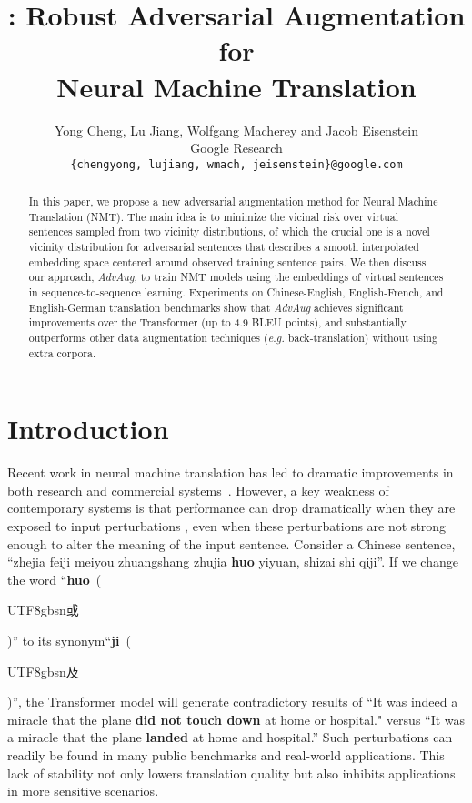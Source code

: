 \documentclass[11pt,a4paper]{article}
\title{\fancyname: Robust Adversarial Augmentation for \\ Neural Machine Translation
}
\author{Yong Cheng, Lu Jiang, Wolfgang Macherey and Jacob Eisenstein \\
Google Research \\
\texttt{\{chengyong, lujiang, wmach, jeisenstein\}@google.com}\\}
\date{}
\newcommand{\eg}{\emph{e.g. }} \newcommand{\Eg}{\emph{E.g}}
\newcommand{\cn}[1]{\begin{CJK*}{UTF8}{gbsn}{#1}\end{CJK*}}
\newcommand{\fancyname}{AdvAug}
\begin{document}
\maketitle
\begin{abstract}
In this paper, we propose a new adversarial augmentation method for Neural Machine Translation (NMT).
The main idea is to minimize the vicinal risk over virtual sentences sampled from two vicinity distributions, of which the crucial one is a novel vicinity distribution for adversarial sentences that describes a smooth interpolated embedding space centered around observed training sentence pairs. We then discuss our approach, {\em \fancyname}, to train NMT models using the embeddings of virtual sentences in sequence-to-sequence learning. Experiments on Chinese-English, English-French, and English-German translation benchmarks show that {\em \fancyname} achieves significant improvements over the Transformer (up to 4.9 BLEU points), and substantially outperforms other data augmentation techniques (\eg back-translation) without using extra corpora.
\end{abstract}

\section{Introduction}
Recent work in neural machine translation \cite{Bahdanau:15,Gehring:17,Vaswani:17} has led to dramatic improvements in both research and commercial systems~\cite{Wu:16}.
However, a key weakness of contemporary systems is that performance can drop dramatically when they are exposed to input perturbations \cite{Belinkov:17, Cheng:19}, even when these perturbations are not strong enough to alter the meaning of the input sentence. 
Consider a Chinese sentence, ``zhejia feiji meiyou zhuangshang zhujia \textbf{huo} yiyuan, shizai shi qiji''. If we change the word ``\textbf{huo}~(\cn{或})'' to its synonym``\textbf{ji}~(\cn{及})'', the Transformer model will generate contradictory results of ``It was indeed a miracle that the plane \textbf{did not touch down} at home or hospital." versus ``It was a miracle that the plane \textbf{landed} at home and hospital.''
Such perturbations can readily be found in many public benchmarks and real-world applications. 
This lack of stability not only lowers translation quality but also inhibits applications in more sensitive scenarios.
\end{document}
